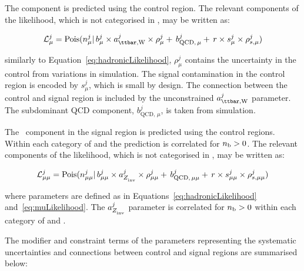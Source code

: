 The \ttw component is predicted using the \mj control region. The relevant 
components of the likelihood, which is not categorised in \mht, may be written as:

\begin{equation}
\label{eq:muLikelihood}
\mathcal{L}^{j}_{\mu} = \mathrm{Pois}(n^{j}_{\mu} |\, b^{j}_{\mu}\times a_{\ttw}^{j}\times\rho^{j}_{\mu} +\, b^{j}_{\text{QCD},\,\mu} + \,r \times s^{j}_{\mu}\times\rho^{j}_{s,\mu})
\end{equation}

similarly to Equation~\ref{eq:hadronicLikelihood}, $\rho^{j}_{\mu}$ contains the uncertainty in the control \htcat from variations in simulation. 
The signal contamination in the control region is encoded by $s^{j}_{\mu}$, which is small by design. 
The connection between the control and signal region
is included by the unconstrained $a_{\ttw}^{j}$ parameter. The 
subdominant QCD component, $b^{j}_{\text{QCD},\,\mu}$, is taken from simulation. 

The \zInv~component in the signal region is predicted using the \mmj control regions. 
Within each category of \njet and \scalht the prediction is correlated 
for  $n_{\text{b}} > 0$. The relevant components of the likelihood, which is not categorised in \mht, may be written as:

\begin{equation}
\label{eq:mumuLikelihood}
\mathcal{L}^{j}_{\mu\mu} = \mathrm{Pois}(n^{j}_{\mu\mu} |\, b^{j}_{\mu\mu}\times a_{Z_{\rm inv}^{~}}^{j}\times\rho^{j}_{\mu\mu} +\, b^{j}_{\text{QCD},\,\mu\mu} + \,r \times s^{j}_{\mu\mu}\times\rho^{j}_{s,\mu\mu})
\end{equation}

where parameters are defined as in Equations~\ref{eq:hadronicLikelihood} and~\ref{eq:muLikelihood}. 
The $a_{Z_{\rm inv}^{~}}^{j}$ parameter is correlated for $n_{\text{b}} > 0$ within each 
category of \njet and \scalht.

The modifier and constraint terms of the parameters representing the systematic uncertainties and 
connections between control and signal regions are summarised below:

